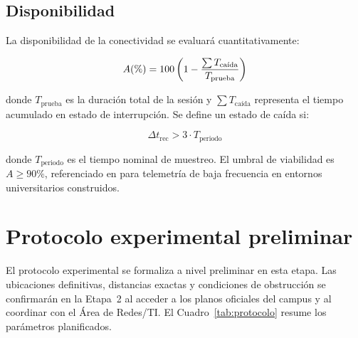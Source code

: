 \documentclass[12pt,oneside,openany,spanish,oldfontcommands]{memoir}
\begin{document}
\subsection{Disponibilidad}

La disponibilidad de la conectividad se evaluará cuantitativamente:

\begin{equation}
A(\%) =
100\left(1 - \frac{\sum T_{\text{ca\'{\i}da}}}{T_{\text{prueba}}}\right)
\label{eq:availability}
\end{equation}

donde $T_{\text{prueba}}$ es la duración total de la sesión y $\sum T_{\text{caída}}$
representa el tiempo acumulado en estado de interrupción. Se define un estado de caída si:

\begin{equation}
\Delta t_{\text{rec}} > 3 \cdot T_{\text{periodo}}
\label{eq:timeout}
\end{equation}

donde $T_{\text{periodo}}$ es el tiempo nominal de muestreo. El umbral de viabilidad es
$A \geq 90\%$, referenciado en \textcite{barrachina2023campus} para telemetría de baja
frecuencia en entornos universitarios construidos.

\section{Protocolo experimental preliminar}
\label{sec:protocolo-experimental}

El protocolo experimental se formaliza a nivel preliminar en esta etapa. Las ubicaciones
definitivas, distancias exactas y condiciones de obstrucción se confirmarán en la
Etapa~2 al acceder a los planos oficiales del campus y al coordinar con el Área de Redes/TI.
El Cuadro~\ref{tab:protocolo} resume los parámetros planificados.
\end{document}
